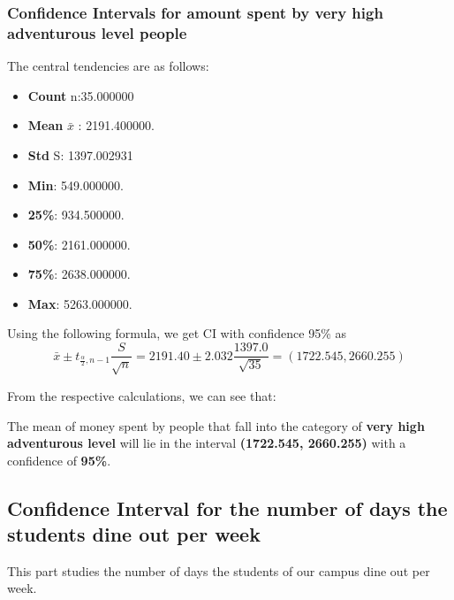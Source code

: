 \documentclass[12pt]{article}
\begin{document}
    \subsubsection{Confidence Intervals for amount spent by very high adventurous level people}
         The central tendencies are as follows:
        \begin{itemize}
            \item \textbf{Count} n:35.000000
            \item \textbf{Mean} $\bar{x}$ : 2191.400000.
            \item \textbf{Std} S: 1397.002931
            \item \textbf{Min}: 549.000000.
            \item \textbf{25\%}: 934.500000.
            \item \textbf{50\%}: 2161.000000.
            \item \textbf{75\%}: 2638.000000.
            \item \textbf{Max}: 5263.000000.
        \end{itemize}
         Using the following formula, we get CI with confidence 95\% as
        \begin{equation}
        \bar{x} \pm t_{\frac{\alpha}{2}, n-1} \frac{S}{\sqrt{n}} =
        2191.40 \pm 2.032 \frac{1397.0}{\sqrt{35}} = (1722.545,2660.255)
        \end{equation}

        From the respective calculations, we can see that:
        
        \item The mean of money spent by people that fall into the category of \textbf{very high adventurous level} will lie in the interval \textbf{(1722.545, 2660.255)} with a confidence of \textbf{95\%}.

\subsection{Confidence Interval for the number of days the students  dine out per week}
    This part studies the number of days the students of our campus dine out per week. 
\end{document}
